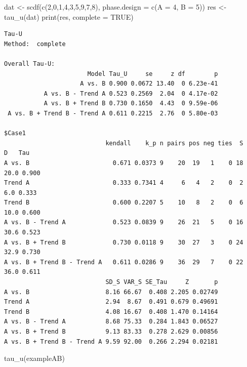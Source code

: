 \documentclass[
]{book}
\newenvironment{Shaded}{\begin{snugshade}}{\end{snugshade}}
\newcommand{\AttributeTok}[1]{\textcolor[rgb]{0.77,0.63,0.00}{#1}}
\newcommand{\ConstantTok}[1]{\textcolor[rgb]{0.00,0.00,0.00}{#1}}
\newcommand{\DecValTok}[1]{\textcolor[rgb]{0.00,0.00,0.81}{#1}}
\newcommand{\FunctionTok}[1]{\textcolor[rgb]{0.00,0.00,0.00}{#1}}
\newcommand{\NormalTok}[1]{#1}
\newcommand{\OtherTok}[1]{\textcolor[rgb]{0.56,0.35,0.01}{#1}}
\begin{document}
\begin{Shaded}
\begin{Highlighting}[]
\NormalTok{dat }\OtherTok{\textless{}{-}} \FunctionTok{scdf}\NormalTok{(}\FunctionTok{c}\NormalTok{(}\DecValTok{2}\NormalTok{,}\DecValTok{0}\NormalTok{,}\DecValTok{1}\NormalTok{,}\DecValTok{4}\NormalTok{,}\DecValTok{3}\NormalTok{,}\DecValTok{5}\NormalTok{,}\DecValTok{9}\NormalTok{,}\DecValTok{7}\NormalTok{,}\DecValTok{8}\NormalTok{), }\AttributeTok{phase.design =} \FunctionTok{c}\NormalTok{(}\AttributeTok{A =} \DecValTok{4}\NormalTok{, }\AttributeTok{B =} \DecValTok{5}\NormalTok{))}
\NormalTok{res }\OtherTok{\textless{}{-}} \FunctionTok{tau\_u}\NormalTok{(dat)}
\FunctionTok{print}\NormalTok{(res, }\AttributeTok{complete =} \ConstantTok{TRUE}\NormalTok{)}
\end{Highlighting}
\end{Shaded}

\begin{verbatim}
Tau-U
Method:  complete 

Overall Tau-U: 
                       Model Tau_U     se     z df        p
                     A vs. B 0.900 0.0672 13.40  0 6.23e-41
           A vs. B - Trend A 0.523 0.2569  2.04  0 4.17e-02
           A vs. B + Trend B 0.730 0.1650  4.43  0 9.59e-06
 A vs. B + Trend B - Trend A 0.611 0.2215  2.76  0 5.80e-03

$Case1
                            kendall    k_p n pairs pos neg ties  S    D   Tau
A vs. B                       0.671 0.0373 9    20  19   1    0 18 20.0 0.900
Trend A                       0.333 0.7341 4     6   4   2    0  2  6.0 0.333
Trend B                       0.600 0.2207 5    10   8   2    0  6 10.0 0.600
A vs. B - Trend A             0.523 0.0839 9    26  21   5    0 16 30.6 0.523
A vs. B + Trend B             0.730 0.0118 9    30  27   3    0 24 32.9 0.730
A vs. B + Trend B - Trend A   0.611 0.0286 9    36  29   7    0 22 36.0 0.611
                            SD_S VAR_S SE_Tau     Z       p
A vs. B                     8.16 66.67  0.408 2.205 0.02749
Trend A                     2.94  8.67  0.491 0.679 0.49691
Trend B                     4.08 16.67  0.408 1.470 0.14164
A vs. B - Trend A           8.68 75.33  0.284 1.843 0.06527
A vs. B + Trend B           9.13 83.33  0.278 2.629 0.00856
A vs. B + Trend B - Trend A 9.59 92.00  0.266 2.294 0.02181
\end{verbatim}

\begin{Shaded}
\begin{Highlighting}[]
\FunctionTok{tau\_u}\NormalTok{(exampleAB)}
\end{Highlighting}
\end{Shaded}
\end{document}
